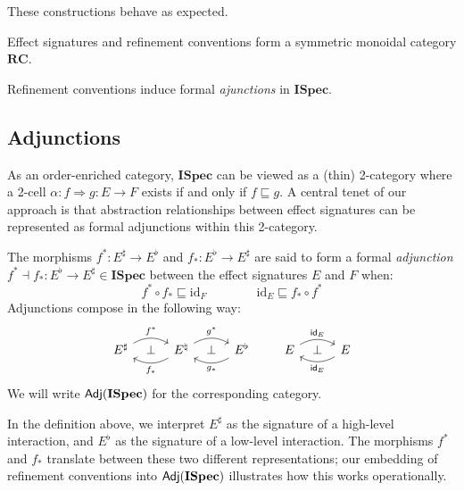 \documentclass[acmsmall,review,anonymous]{acmart}\settopmatter{printfolios=true,printccs=false,printacmref=false}
\newcommand{\ISpec}{\mathbf{ISpec}}
\begin{document}
\noindent
These constructions behave as expected.

\begin{theorem}
Effect signatures and refinement conventions
form a symmetric monoidal category $\mathbf{RC}$.
\end{theorem}

\noindent
Refinement conventions induce formal \emph{ajunctions} in $\ISpec$.


\subsection{Adjunctions} %

As an order-enriched category,
$\ISpec$ can be viewed as a (thin) 2-category
where
a 2-cell $\alpha : f \Rightarrow g : E \rightarrow F$ exists
if and only if $f \sqsubseteq g$.
A central tenet of our approach
is that abstraction relationships
between effect signatures
can be represented as formal adjunctions
within this 2-category.

\begin{definition}[Adjunction]
The morphisms
$f^* : E^\sharp \rightarrow E^\flat$ and
$f_* : E^\flat \rightarrow E^\sharp$
are said to form a formal \emph{adjunction}
$f^* \dashv f_* : E^\flat \rightarrow E^\sharp \in \ISpec$
between the effect signatures $E$ and $F$
when:
\[
  f^* \circ f_* \sqsubseteq \mathrm{id}_F
  \qquad \qquad
  \mathrm{id}_E \sqsubseteq f_* \circ f^*
\]
Adjunctions compose in the following way:
\[
  \begin{tikzcd}[sep=tiny]
    E^\sharp \ar[rr, "f^*", bend left] & \bot &
    E^\natural \ar[ll, "f_*", bend left]
      \ar[rr, "g^*", bend left] & \bot &
    E^\flat \ar[ll, "g_*", bend left]
  \end{tikzcd}
  \qquad
  \begin{tikzcd}[sep=tiny]
    E \ar[rr, "\kw{id}_E", bend left] & \bot &
    E \ar[ll, "\kw{id}_E", bend left]
  \end{tikzcd}
\]
We will write $\kw{Adj}(\ISpec)$ for the corresponding category.
\end{definition}

In the definition above,
we interpret
$E^\sharp$ as the signature of a high-level interaction, and
$E^\flat$ as the signature of a low-level interaction.
The morphisms $f^*$ and $f_*$ translate between
these two different representations;
our embedding of refinement conventions into $\kw{Adj}(\ISpec)$
illustrates how this works operationally.
\end{document}
